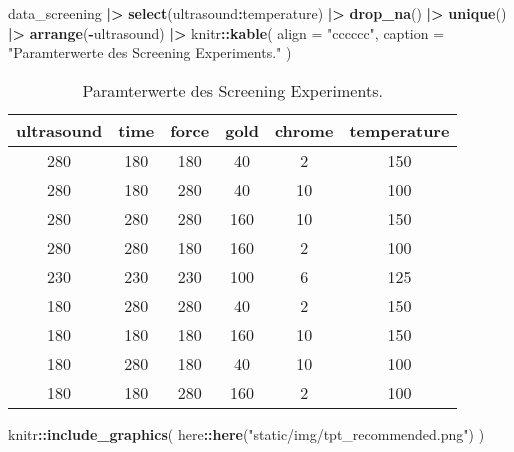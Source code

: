 \documentclass[
  paper=a4,
  ,captions=tableheading
]{scrartcl}
\newenvironment{Shaded}{\begin{snugshade}}{\end{snugshade}}
\newcommand{\DataTypeTok}[1]{\textcolor[rgb]{0.13,0.29,0.53}{#1}}
\newcommand{\ErrorTok}[1]{\textcolor[rgb]{0.64,0.00,0.00}{\textbf{#1}}}
\newcommand{\KeywordTok}[1]{\textcolor[rgb]{0.13,0.29,0.53}{\textbf{#1}}}
\newcommand{\NormalTok}[1]{#1}
\newcommand{\OperatorTok}[1]{\textcolor[rgb]{0.81,0.36,0.00}{\textbf{#1}}}
\newcommand{\StringTok}[1]{\textcolor[rgb]{0.31,0.60,0.02}{#1}}
\begin{document}
\begin{Shaded}
\begin{Highlighting}[]
\NormalTok{data_screening }\OperatorTok{|}\ErrorTok{>}\StringTok{ }
\StringTok{  }\KeywordTok{select}\NormalTok{(ultrasound}\OperatorTok{:}\NormalTok{temperature) }\OperatorTok{|}\ErrorTok{>}\StringTok{ }
\StringTok{  }\KeywordTok{drop_na}\NormalTok{() }\OperatorTok{|}\ErrorTok{>}
\StringTok{  }\KeywordTok{unique}\NormalTok{() }\OperatorTok{|}\ErrorTok{>}\StringTok{ }
\StringTok{  }\KeywordTok{arrange}\NormalTok{(}\OperatorTok{-}\NormalTok{ultrasound) }\OperatorTok{|}\ErrorTok{>}\StringTok{ }
\StringTok{  }\NormalTok{knitr}\OperatorTok{::}\KeywordTok{kable}\NormalTok{(}
    \DataTypeTok{align =} \StringTok{"cccccc"}\NormalTok{,}
    \DataTypeTok{caption =} \StringTok{"Paramterwerte des Screening Experiments."}
\NormalTok{  )}
\end{Highlighting}
\end{Shaded}

\begin{table}

\caption{\label{tab:screening-design}Paramterwerte des Screening Experiments.}
\centering
\begin{tabular}[t]{c|c|c|c|c|c}
\hline
ultrasound & time & force & gold & chrome & temperature\\
\hline
280 & 180 & 180 & 40 & 2 & 150\\
\hline
280 & 180 & 280 & 40 & 10 & 100\\
\hline
280 & 280 & 280 & 160 & 10 & 150\\
\hline
280 & 280 & 180 & 160 & 2 & 100\\
\hline
230 & 230 & 230 & 100 & 6 & 125\\
\hline
180 & 280 & 280 & 40 & 2 & 150\\
\hline
180 & 180 & 180 & 160 & 10 & 150\\
\hline
180 & 280 & 180 & 40 & 10 & 100\\
\hline
180 & 180 & 280 & 160 & 2 & 100\\
\hline
\end{tabular}
\end{table}

\begin{Shaded}
\begin{Highlighting}[]
\NormalTok{knitr}\OperatorTok{::}\KeywordTok{include_graphics}\NormalTok{(}
\NormalTok{  here}\OperatorTok{::}\KeywordTok{here}\NormalTok{(}\StringTok{"static/img/tpt_recommended.png"}\NormalTok{)}
\NormalTok{)}
\end{Highlighting}
\end{Shaded}
\end{document}

